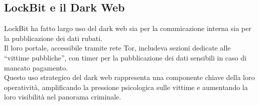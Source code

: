\documentclass[a4paper,12pt,twoside]{article}
\begin{document}
\subsection{LockBit e il Dark Web}

LockBit ha fatto largo uso del dark web sia per la comunicazione interna sia per la pubblicazione dei dati rubati. \\
Il loro portale, accessibile tramite rete Tor, includeva sezioni dedicate alle “vittime pubbliche”, con timer per la pubblicazione dei dati sensibili in caso di mancato pagamento.\\
Questo uso strategico del dark web rappresenta una componente chiave della loro operatività, amplificando la pressione psicologica sulle vittime e aumentando la loro visibilità nel panorama criminale.

\newpage
\end{document}
